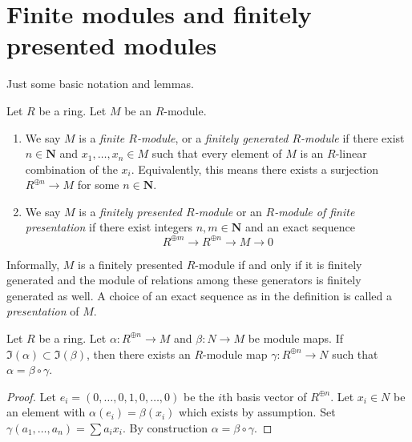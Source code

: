 \section{Finite modules and finitely presented modules}
\label{section-module-finite-type}

\noindent
Just some basic notation and lemmas.

\begin{definition}
\label{definition-module-finite-type}
Let $R$ be a ring. Let $M$ be an $R$-module.
\begin{enumerate}
\item We say $M$ is a {\it finite $R$-module}, or a {\it finitely generated
$R$-module} if there exist $n \in \mathbf{N}$ and $x_1, \ldots, x_n \in M$
such that every element of $M$ is an $R$-linear combination of the $x_i$.
Equivalently, this means there exists a surjection
$R^{\oplus n} \to M$ for some $n \in \mathbf{N}$.
\item We say $M$ is a {\it finitely presented $R$-module} or an
{\it $R$-module of finite presentation} if there exist integers
$n, m \in \mathbf{N}$ and an exact sequence
$$
R^{\oplus m} \longrightarrow R^{\oplus n} \longrightarrow M \longrightarrow 0
$$
\end{enumerate}
\end{definition}

\noindent
Informally, $M$ is a finitely presented $R$-module if and only if
it is finitely generated and the module of relations among these
generators is finitely generated as well.
A choice of an exact sequence as in the definition is called a
{\it presentation} of $M$.

\begin{lemma}
\label{lemma-lift-map}
Let $R$ be a ring. Let $\alpha : R^{\oplus n} \to M$ and $\beta : N \to M$ be
module maps. If $\Im(\alpha) \subset \Im(\beta)$, then there
exists an $R$-module map $\gamma : R^{\oplus n} \to N$ such that
$\alpha = \beta \circ \gamma$.
\end{lemma}

\begin{proof}
Let $e_i = (0, \ldots, 0, 1, 0, \ldots, 0)$ be the $i$th basis vector
of $R^{\oplus n}$. Let $x_i \in N$ be an element with
$\alpha(e_i) = \beta(x_i)$ which exists by assumption. Set
$\gamma(a_1, \ldots, a_n) = \sum a_i x_i$. By construction
$\alpha = \beta \circ \gamma$.
\end{proof}

